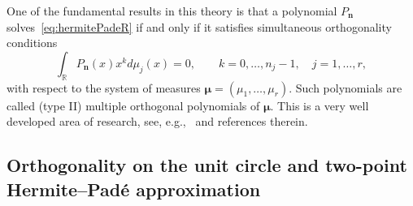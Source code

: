 \documentclass[reqno,centertags,11pt,draft]{amsart}
\newcommand{\R}{\mathbb{R}}
\begin{document}
One of the fundamental results in this theory is that a polynomial $P_{\bm{n}}$ %
solves~\eqref{eq:hermitePadeR} if and only if it satisfies simultaneous orthogonality conditions 
\begin{equation}\label{eq:MOPRL}
    \int_\R P_{\bm{n}}(x) x^{k}  d\mu_j(x) = 0,
    \qquad k = 0,\ldots,n_j-1, \quad j = 1,\ldots,r,
\end{equation}
with respect to the system of measures 
$\bm{\mu}=(\mu_1,\ldots,\mu_r)$. Such polynomials are called (type II) multiple orthogonal polynomials of $\bm\mu$.
This is a very well developed area of research, see, e.g.,~\cites{Aptekarev, Ismail, Applications,Nikishin} and references therein.

\subsection{Orthogonality on the unit circle and two-point Hermite--Pad\'{e} approximation}\label{ss:intro2}
\end{document}
